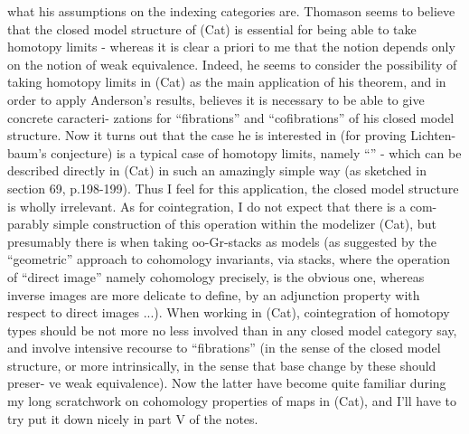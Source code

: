 
what his assumptions on the indexing categories are.  Thomason seems to
believe that the closed model structure of (Cat) is essential for being
able to take homotopy limits  -  whereas it is clear a priori to me that
the notion  depends only on the notion of weak equivalence.  Indeed,
he seems to consider the possibility of taking homotopy limits in (Cat)
as the main application of his theorem,  and in order to apply Anderson's
results,  believes it is necessary to be able to give concrete caracteri-%
zations for ``fibrations'' and ``cofibrations'' of his closed model structure.
Now it turns out that the case he is interested in (for proving Lichten-%
baum's conjecture) is  a typical case of \hand{\uline{\textcolor{black}{direct}}} homotopy
limits,  namely ``\hand{\uwave{\textcolor{black}{integration}}}''  -  which can be described directly in (Cat)
in such an amazingly simple way (as sketched in section 69, p.198-199).
Thus I feel for this application,  the closed model structure is wholly
irrelevant.  As for cointegration,  I do not expect that there is a com-%
parably simple construction of this operation  within the modelizer (Cat),
but presumably there is when taking $\mathrm{oo}$-Gr-stacks as models  (as suggested
by the ``geometric'' approach to cohomology invariants,  via stacks, 
where the operation of ``direct image''  namely cohomology precisely,  is
the obvious one,  whereas inverse images are more delicate to define, by
an adjunction property with respect to direct images ...).  When working
in (Cat),  cointegration of homotopy types should be not more no less
involved than in  any closed model category say,  and involve intensive
recourse to ``fibrations'' (in the sense of the closed model structure,  or
more intrinsically,  in the sense that base change by these should preser-%
ve weak equivalence).  Now  the latter have become quite familiar  
during my long scratchwork on cohomology properties of maps in (Cat),
and I'll  have to try put it down nicely in part V of the notes.

